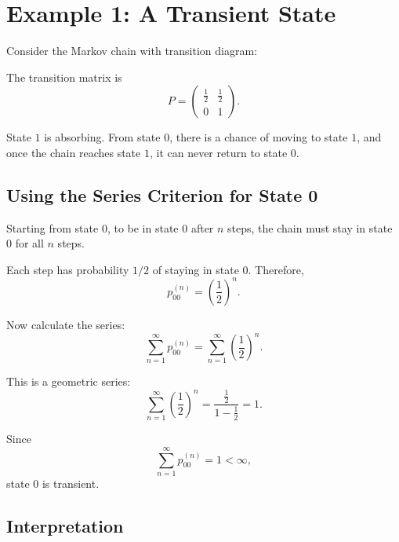 \documentclass[12pt,a4paper]{article}
\theoremstyle{notestyle}
\begin{document}
\section{Example 1: A Transient State}

Consider the Markov chain with transition diagram:

\begin{center}
\end{center}

The transition matrix is
\[
P=
\begin{pmatrix}
\frac12 & \frac12\\
0 & 1
\end{pmatrix}.
\]

State $1$ is absorbing. From state $0$, there is a chance of moving to state $1$, and once the chain reaches state $1$, it can never return to state $0$.

\subsection{Using the Series Criterion for State 0}

Starting from state $0$, to be in state $0$ after $n$ steps, the chain must stay in state $0$ for all $n$ steps.

Each step has probability $1/2$ of staying in state $0$. Therefore,
\[
p_{00}^{(n)}=\left(\frac12\right)^n.
\]

Now calculate the series:
\[
\sum_{n=1}^{\infty}p_{00}^{(n)}
=
\sum_{n=1}^{\infty}\left(\frac12\right)^n.
\]

This is a geometric series:
\[
\sum_{n=1}^{\infty}\left(\frac12\right)^n
=
\frac{\frac12}{1-\frac12}
=1.
\]

Since
\[
\sum_{n=1}^{\infty}p_{00}^{(n)}=1<\infty,
\]
state $0$ is transient.

\subsection{Interpretation}
\end{document}
